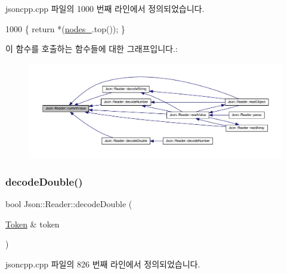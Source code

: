 jsoncpp.\+cpp 파일의 1000 번째 라인에서 정의되었습니다.


\begin{DoxyCode}
1000 \{ \textcolor{keywordflow}{return} *(\hyperlink{class_json_1_1_reader_ada3d2c47699dad662e6d156c8c78a6ac}{nodes\_}.top()); \}
\end{DoxyCode}
이 함수를 호출하는 함수들에 대한 그래프입니다.\+:\nopagebreak
\begin{figure}[H]
\begin{center}
\leavevmode
\includegraphics[width=350pt]{class_json_1_1_reader_a85597f763fb0148a17359b6dfc6f7326_icgraph}
\end{center}
\end{figure}
\mbox{\label{class_json_1_1_reader_a2420bbb7fd6d5d3e7e2fea894dd8f70f}} 
\subsubsection{\texorpdfstring{decode\+Double()}{decodeDouble()}\hspace{0.1cm}{\footnotesize\ttfamily [1/2]}}
{\footnotesize\ttfamily bool Json\+::\+Reader\+::decode\+Double (\begin{DoxyParamCaption}\item[{\hyperlink{class_json_1_1_reader_1_1_token}{Token} \&}]{token }\end{DoxyParamCaption})\hspace{0.3cm}{\ttfamily [private]}}



jsoncpp.\+cpp 파일의 826 번째 라인에서 정의되었습니다.



